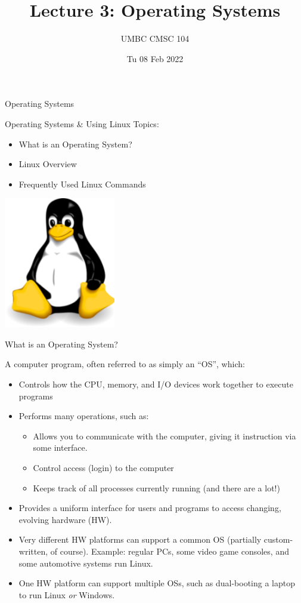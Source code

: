 \documentclass[graphics]{beamer}
\title{Lecture 3: Operating Systems}
\author{UMBC CMSC 104}
\date{Tu 08 Feb 2022}
\begin{document}
\begin{frame}{}
\centering
    Operating Systems
\end{frame}

\begin{frame}{Operating Systems \& Using Linux}
    Topics:
    \begin{itemize}
        \item What is an Operating System?
        \item Linux Overview
        \item Frequently Used Linux Commands
    \end{itemize}
    \hfill
    \includegraphics[scale=0.3]{L03_OperatingSystems/L3_tux.png}
\end{frame}

\begin{frame}{What is an Operating System?}
     {
        A computer program, often referred to as simply an ``OS'', which:
        \begin{itemize}
            \item Controls how the CPU, memory, and I/O devices work together to execute programs
            \item Performs many operations, such as:
            \begin{itemize}
                \item Allows you to communicate with the computer, giving it instruction via some interface.
                \item Control access (login) to the computer
                \item Keeps track of all processes currently running (and there are a lot!)
            \end{itemize}
        \end{itemize}
    }
     {
        \begin{itemize}
            \item Provides a uniform interface for users and programs to access changing, evolving hardware (HW).
            \item Very different HW platforms can support a common OS (partially custom-written, of course). Example: regular PCs, some video game consoles, and some automotive systems run Linux.
            \item One HW platform can support multiple OSs, such as dual-booting a laptop to run Linux \textit{or} Windows.
        \end{itemize}
    }
\end{frame}
\end{document}
